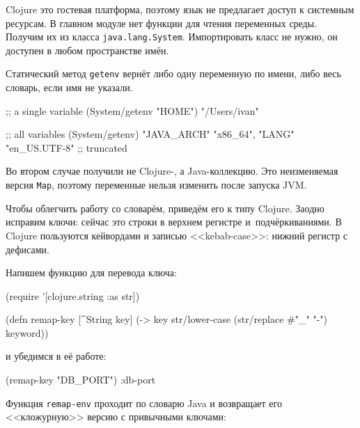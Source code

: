 
Clojure это гостевая платформа, поэтому язык не предлагает доступ к системным
ресурсам. В главном модуле нет функции для чтения переменных среды. Получим их
из класса \verb|java.lang.System|. Импортировать класс не нужно, он доступен в
любом пространстве имён.

Статический метод \verb|getenv| вернёт либо одну переменную по имени, либо
весь словарь, если имя не указали.

\begin{english}
  \begin{clojure}
;; a single variable
(System/getenv "HOME")
"/Users/ivan"

;; all variables
(System/getenv)
{"JAVA_ARCH" "x86_64", "LANG" "en_US.UTF-8"} ;; truncated
  \end{clojure}
\end{english}

Во втором случае получили не Clojure-, а Java-коллекцию. Это неизменяемая версия
\verb|Map|, поэтому переменные нельзя изменить после запуска JVM.

Чтобы облегчить работу со словарём, приведём его к типу Clojure. Заодно исправим
ключи: сейчас это строки в верхнем регистре и~подчёркиваниями. В Clojure
пользуются кейвордами и записью <<kebab-case>>: нижний регистр с дефисами.


Напишем функцию для перевода ключа:

\begin{english}
  \begin{clojure}
(require '[clojure.string :as str])

(defn remap-key [^String key]
  (-> key
      str/lower-case
      (str/replace #"_" "-")
      keyword))
  \end{clojure}
\end{english}

\noindent
и убедимся в её работе:

\begin{english}
  \begin{clojure}
(remap-key "DB_PORT")
:db-port
  \end{clojure}
\end{english}


Функция \verb|remap-env| проходит по словарю Java и возвращает его
<<кложурную>> версию с привычными ключами:

